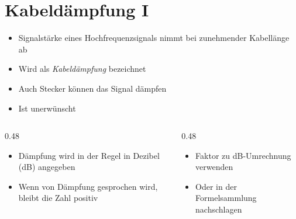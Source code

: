 \section{Kabeldämpfung I}
\label{section:kabeldaempfung_1}
\begin{frame}%
    \begin{itemize}
        \item Signalstärke eines Hochfrequenzsignals nimmt bei zunehmender Kabellänge ab
        \item Wird als \emph{Kabeldämpfung} bezeichnet
        \item Auch Stecker können das Signal dämpfen
        \item Ist unerwünscht
    \end{itemize}
\end{frame}

\begin{frame}
    \begin{columns}
        \begin{column}{0.48\textwidth}
            \begin{itemize}
                \item Dämpfung wird in der Regel in Dezibel (dB) angegeben
                \item Wenn von Dämpfung gesprochen wird, bleibt die Zahl positiv
            \end{itemize}

        \end{column}
        \begin{column}{0.48\textwidth}
            \begin{itemize}
                \item Faktor zu dB-Umrechnung verwenden
                \item Oder in der Formelsammlung nachschlagen
            \end{itemize}

        \end{column}
    \end{columns}

\end{frame}

\begin{frame}
\end{frame}

